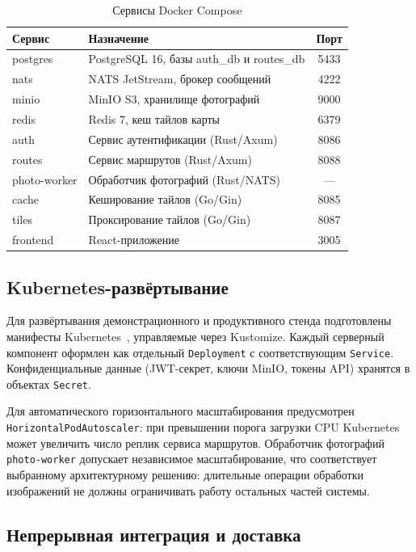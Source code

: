 \begin{table}[H]
\caption{Сервисы Docker Compose}
\label{tab:docker-services}
\begin{tabularx}{\textwidth}{|l|X|c|}
\hline
\textbf{Сервис} & \textbf{Назначение} & \textbf{Порт} \\
\hline
postgres & PostgreSQL 16, базы auth\_db и routes\_db & 5433 \\
\hline
nats & NATS JetStream, брокер сообщений & 4222 \\
\hline
minio & MinIO S3, хранилище фотографий & 9000 \\
\hline
redis & Redis 7, кеш тайлов карты & 6379 \\
\hline
auth & Сервис аутентификации (Rust/Axum) & 8086 \\
\hline
routes & Сервис маршрутов (Rust/Axum) & 8088 \\
\hline
photo-worker & Обработчик фотографий (Rust/NATS) & --- \\
\hline
cache & Кеширование тайлов (Go/Gin) & 8085 \\
\hline
tiles & Проксирование тайлов (Go/Gin) & 8087 \\
\hline
frontend & React-приложение & 3005 \\
\hline
\end{tabularx}
\end{table}

\subsection{Kubernetes-развёртывание}

Для развёртывания демонстрационного и продуктивного стенда подготовлены
манифесты Kubernetes~\cite{luksa2018}, управляемые через Kustomize. Каждый
серверный компонент оформлен как отдельный \texttt{Deployment} с соответствующим
\texttt{Service}. Конфиденциальные данные (JWT-секрет, ключи MinIO, токены API)
хранятся в объектах \texttt{Secret}.

Для автоматического горизонтального масштабирования предусмотрен
\texttt{HorizontalPodAutoscaler}: при превышении порога загрузки CPU Kubernetes
может увеличить число реплик сервиса маршрутов. Обработчик фотографий
\texttt{photo-worker} допускает независимое масштабирование, что соответствует
выбранному архитектурному решению: длительные операции обработки изображений не
должны ограничивать работу остальных частей системы.

\subsection{Непрерывная интеграция и доставка}

